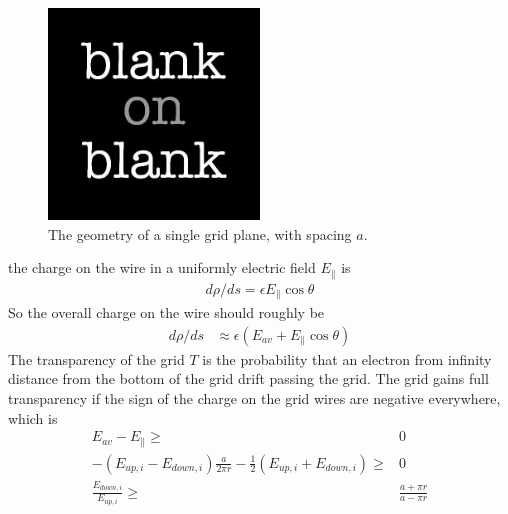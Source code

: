 \begin{figure}
\centering
\includegraphics[width=0.5\textwidth]{blank.jpg}
\caption{The geometry of a single grid plane, with spacing $a$.}
\label{fig: single wire}
\end{figure}
the charge on the wire in a uniformly electric field $E_{\parallel}$ is 
\begin{align}
d\rho/ds = \epsilon E_{\parallel} \cos \theta
\end{align}
So the overall charge on the wire should roughly be
\begin{align}
d\rho/ds & \approx \epsilon (E_{av}+E_{\parallel} \cos \theta) 
\end{align}
The transparency of the grid $T$ is the probability that an electron from infinity distance from the bottom of the grid drift passing the grid. The grid gains full transparency if the sign of the charge on the grid wires are negative everywhere, which is
\begin{align}
E_{av}-E_{\parallel} \geq & 0 \\
-(E_{up, i}-E_{down,i})\frac{a}{2 \pi r} - \frac{1}{2}(E_{up,i}+E_{down,i}) \geq & 0 \\
\frac{E_{down,i}}{E_{up,i}} \geq & \frac{a + \pi r}{a - \pi r}
\end{align}
